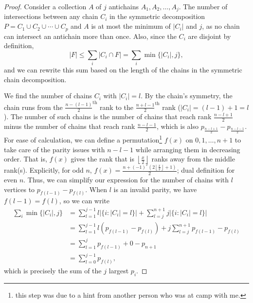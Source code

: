 \documentclass[11pt]{scrartcl}
\begin{document}
\begin{proof}


    Consider a collection $A$ of $j$ antichains $A_1,A_2,\dots,A_j$. The number of intersections between any chain $C_i$ in the symmetric decomposition $P=C_1\cup C_2\cup\cdots\cup C_p$ and $A$ is at most the minimum of $|C_i|$ and $j$, as no chain can intersect an antichain more than once. Also, since the $C_i$ are disjoint by definition, \[|F|\leq\sum_i |C_i\cap F|=\sum_i \min\{|C_i|,j\},\] and we can rewrite this sum based on the length of the chains in the symmetric chain decomposition.  
    
    We find the number of chains $C_i$ with $|C_i|=l$. By the chain's symmetry, the chain runs from the $\frac{n-(l-1)}{2}^{\text{th}}$ rank to the $\frac{n+l-1}{2}^{\text{th}}$ rank ($|C_i|=(l-1)+1=l$). The number of such chains is the number of chains that reach rank $\frac{n-l+1}{2}$ minus the number of chains that reach rank $\frac{n-l-1}{2}$, which is also $p_{\frac{n-l+1}{2}}-p_{\frac{n-l-1}{2}}$. For ease of calculation, we can define a permutation\footnote{this step was due to a hint from another person who was at camp with me.} $f(x)$ on $0,1,\dots,n+1$ to take care of the parity issues with $n-l-1$ while arranging them in decreasing order. That is, $f(x)$ gives the rank that is $\left\lfloor\frac{x}{2}\right\rfloor$ ranks away from the middle rank(s). Explicitly, for odd $n$, $f(x)=\frac{n+(-1)^x\left(2\left\lfloor\frac{x}2\right\rfloor+1\right)}2$; dual definition for even $n$. Thus, we can simplify our expression for the number of chains with $l$ vertices to $p_{f(l-1)}-p_{f(l)}$. When $l$ is an invalid parity, we have $f(l-1)=f(l)$, so we can write
    \begin{align*}
        \sum_i\min\{|C_i|,j\}&=\sum_{l=1}^{j-1}l|\{i:|C_i|=l\}|+\sum_{l=j}^{n+1}j|\{i:|C_i|=l\}|\\
        &=\sum_{l=1}^{j-1}l(p_{f(l-1)}-p_{f(l)})+j\sum_{l=j}^{n+1}p_{f(l-1)}-p_{f(l)}\\
        &=\sum_{l=1} ^{j}p_{f(l-1)}+0-p_{n+1}\\
        &=\sum_{l=0}^{j-1}p_{f(l)},
    \end{align*}
    which is precisely the sum of the $j$ largest $p_i$.
\end{proof}
\end{document}
